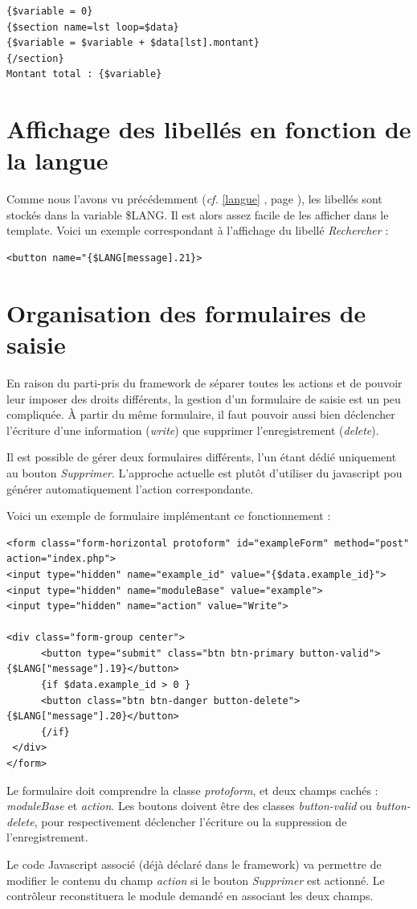 \begin{lstlisting}
{$variable = 0}
{$section name=lst loop=$data}
{$variable = $variable + $data[lst].montant}
{/section}
Montant total : {$variable}
\end{lstlisting}

\section{Affichage des libellés en fonction de la langue}

Comme nous l'avons vu précédemment (\textit{cf.} \ref{langue} \textit{}, page \pageref{langue}), les libellés sont stockés dans la variable \$LANG. Il est alors assez facile de les afficher dans le template. Voici un exemple correspondant à l'affichage du libellé \textit{Rechercher} :
\begin{lstlisting}
<button name="{$LANG[message].21}>
\end{lstlisting}


\section{Organisation des formulaires de saisie}

En raison du parti-pris du framework de séparer toutes les actions et de pouvoir leur imposer des droits différents, la gestion d'un formulaire de saisie est un peu compliquée. À partir du même formulaire, il faut pouvoir aussi bien déclencher l'écriture d'une information (\textit{write}) que supprimer l'enregistrement (\textit{delete}). 

Il est possible de gérer deux formulaires différents, l'un étant dédié uniquement au bouton \textit{Supprimer}. L'approche actuelle est plutôt d'utiliser du javascript pou générer automatiquement l'action correspondante.

Voici un exemple de formulaire implémentant ce fonctionnement :

\begin{lstlisting}
<form class="form-horizontal protoform" id="exampleForm" method="post" action="index.php">
<input type="hidden" name="example_id" value="{$data.example_id}">
<input type="hidden" name="moduleBase" value="example">
<input type="hidden" name="action" value="Write">

<div class="form-group center">
      <button type="submit" class="btn btn-primary button-valid">{$LANG["message"].19}</button>
      {if $data.example_id > 0 }
      <button class="btn btn-danger button-delete">{$LANG["message"].20}</button>
      {/if}
 </div>
</form>
\end{lstlisting}

Le formulaire doit comprendre la classe \textit{protoform}, et deux champs cachés : \textit{moduleBase} et \textit{action}. Les boutons doivent être des classes \textit{button-valid} ou \textit{button-delete}, pour respectivement déclencher l'écriture ou la suppression de l'enregistrement.

Le code Javascript associé (déjà déclaré dans le framework) va permettre de modifier le contenu du champ \textit{action} si le bouton \textit{Supprimer} est actionné. Le contrôleur reconstituera le module demandé en associant les deux champs.